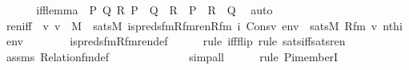 \begin{isabellebody}
%
\isadelimproof
%
\endisadelimproof
%
\isatagproof
{}\isamarkupfalse%
\ {\isacharminus}{\kern0pt}\ \isanewline
\ \ \isamarkupfalse%
\ iff{\isacharunderscore}{\kern0pt}lemma\ {\isacharcolon}{\kern0pt}\ {\isachardoublequoteopen}{\isasymAnd}P\ Q\ R{\isachardot}{\kern0pt}\ {\isacharparenleft}{\kern0pt}P\ {\isasymlongleftrightarrow}\ Q{\isacharparenright}{\kern0pt}\ {\isasymLongrightarrow}\ {\isacharparenleft}{\kern0pt}R\ {\isasymlongleftrightarrow}\ P{\isacharparenright}{\kern0pt}\ {\isasymlongleftrightarrow}\ {\isacharparenleft}{\kern0pt}R\ {\isasymlongleftrightarrow}\ Q{\isacharparenright}{\kern0pt}{\isachardoublequoteclose}\ \isamarkupfalse%
\ auto\isanewline
\isanewline
\ \ \isamarkupfalse%
\ ren{\isacharunderscore}{\kern0pt}iff{\isacharcolon}{\kern0pt}\ \ {\isachardoublequoteopen}{\isasymAnd}v{\isachardot}{\kern0pt}\ v\ {\isasymin}\ M\ {\isasymLongrightarrow}\ sats{\isacharparenleft}{\kern0pt}M{\isacharcomma}{\kern0pt}\ is{\isacharunderscore}{\kern0pt}preds{\isacharunderscore}{\kern0pt}fm{\isacharunderscore}{\kern0pt}Rfm{\isacharunderscore}{\kern0pt}ren{\isacharparenleft}{\kern0pt}Rfm{\isacharcomma}{\kern0pt}\ i{\isacharparenright}{\kern0pt}{\isacharcomma}{\kern0pt}\ Cons{\isacharparenleft}{\kern0pt}v{\isacharcomma}{\kern0pt}\ env{\isacharparenright}{\kern0pt}{\isacharparenright}{\kern0pt}\ {\isasymlongleftrightarrow}\ sats{\isacharparenleft}{\kern0pt}M{\isacharcomma}{\kern0pt}\ Rfm{\isacharcomma}{\kern0pt}\ {\isacharbrackleft}{\kern0pt}v{\isacharcomma}{\kern0pt}\ nth{\isacharparenleft}{\kern0pt}i{\isacharcomma}{\kern0pt}\ env{\isacharparenright}{\kern0pt}\ {\isacharbrackright}{\kern0pt}{\isacharparenright}{\kern0pt}{\isachardoublequoteclose}\ \isanewline
\ \ \ \ \isamarkupfalse%
\ is{\isacharunderscore}{\kern0pt}preds{\isacharunderscore}{\kern0pt}fm{\isacharunderscore}{\kern0pt}Rfm{\isacharunderscore}{\kern0pt}ren{\isacharunderscore}{\kern0pt}def\ \isanewline
\ \ \ \ \isamarkupfalse%
{\isacharparenleft}{\kern0pt}rule\ iff{\isacharunderscore}{\kern0pt}flip{\isacharcomma}{\kern0pt}\ rule\ sats{\isacharunderscore}{\kern0pt}iff{\isacharunderscore}{\kern0pt}sats{\isacharunderscore}{\kern0pt}ren{\isacharparenright}{\kern0pt}\isanewline
\ \ \ \ \isamarkupfalse%
\ assms\ Relation{\isacharunderscore}{\kern0pt}fm{\isacharunderscore}{\kern0pt}def\ \isanewline
\ \ \ \ \ \ \ \ \ \ \ \isamarkupfalse%
\ simp{\isacharunderscore}{\kern0pt}all\isanewline
\ \ \ \ \ \isamarkupfalse%
{\isacharparenleft}{\kern0pt}rule\ Pi{\isacharunderscore}{\kern0pt}memberI{\isacharparenright}{\kern0pt}\isanewline

\end{isabellebody}
